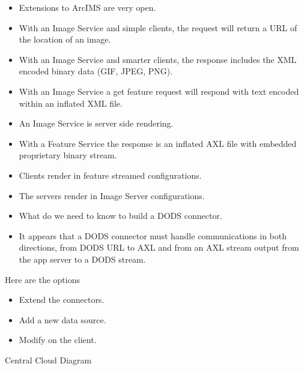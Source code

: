 \begin{itemize}
\item Extensions to ArcIMS are very open.
\item With an Image Service and simple clients, the request will return a URL of the location 
of an image.
\item With an Image Service and smarter clients, the response includes the XML encoded 
binary data (GIF, JPEG, PNG).
\item With an Image Service a get feature request will respond with text encoded within an 
inflated XML file.
\item An Image Service is server side rendering.
\item With a Feature Service the response is an inflated AXL file with embedded proprietary 
binary stream.
\item Clients render in feature streamed configurations.
\item The servers render in Image Server configurations.
\item What do we need to know to build a DODS connector.
\item It appears that a DODS connector must handle communications in both directions, from 
DODS URL to AXL and from an AXL stream output from the app server to a DODS 
stream.
\end{itemize}

        
Here are the options

\begin{itemize}
\item Extend the connectors.
\item Add a new data source.
\item Modify on the client. 
\end{itemize}




Central Cloud Diagram

 


